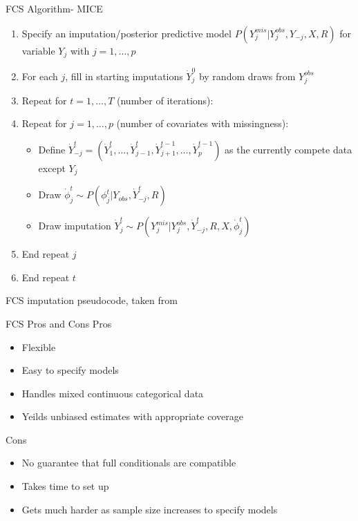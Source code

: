 \begin{frame}{FCS Algorithm- MICE}
 
 \begin{enumerate}
\item Specify an imputation/posterior predictive model $P(Y_{j}^{mis}|Y_{j}^{obs},Y_{-j},X,R)$ for variable $Y_j$ with $j=1,\dots,p$
\item For each $j$, fill in starting imputations $\dot{Y}_j ^{0}$ by random draws from $Y_{j}^{obs}$
\item Repeat for $t=1,\dots, T$ (number of iterations):
\item Repeat for $j=1,\dots,p$ (number of covariates with missingness):
\begin{itemize}
\item Define $\dot{Y}_{-j}^{t}=(\dot{Y}_1^{t},\dots,\dot{Y}_{j-1}^{t},\dot{Y}_{j+1}^{t-1},\dots,\dot{Y}_p^{t-1})$
as the currently compete data except $Y_j$
\item Draw $\dot{\phi}_j^{t}\sim P(\phi_j^t|Y_{obs},\dot{Y}_{-j}^{t},R)$
\item Draw imputation $\dot{Y}_{j}^{t}\sim P(Y_j^{mis}|Y_j^{obs},\dot{Y}_{-j}^{t},R,X,\dot{\phi}_j^{t})$
\end{itemize}
\item End repeat $j$
\item End repeat $t$
\end{enumerate}
FCS imputation pseudocode, taken from \cite{VanBuuren2012}
\end{frame}

\begin{frame}{FCS Pros and Cons}
Pros
 \begin{itemize}
  \item Flexible
  \item Easy to specify models
  \item Handles mixed continuous categorical data
  \item Yeilds unbiased estimates with appropriate coverage
 \end{itemize}

 Cons
 \begin{itemize}
  \item No guarantee that full conditionals are compatible
  \item Takes time to set up
  \item Gets much harder as sample size increases to specify models
 \end{itemize}

\end{frame}

